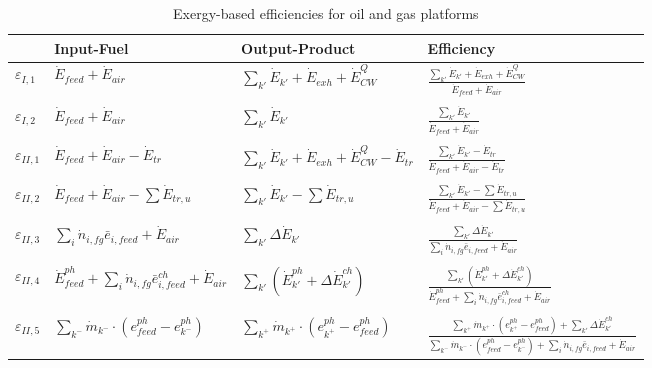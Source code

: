 \begin{table}[htbp]
\scriptsize
  \centering
  \caption{Exergy-based efficiencies for oil and gas platforms}
    \begin{tabular*}{\linewidth}{@{\extracolsep{\fill}}llll}
    \toprule
          & Input-Fuel  & Output-Product & Efficiency \\
	\toprule
	$\varepsilon_{I,1}$ & $\dot{E}_{feed}+\dot{E}_{air}$ & $\sum_{k'}\dot{E}_{k'}+\dot{E}_{exh}+\dot{E}^Q_{CW}$ & $\frac{\sum_{k'}\dot{E}_{k'}+\dot{E}_{exh}+\dot{E}^Q_{CW}}{\dot{E}_{feed}+\dot{E}_{air}}$ \\
    & & & \\	  
	$\varepsilon_{I,2}$ & $\dot{E}_{feed}+\dot{E}_{air}$ & $\sum_{k'}\dot{E}_{k'}$ & $\frac{\sum_{k'}\dot{E}_{k'}}{\dot{E}_{feed}+\dot{E}_{air}}$ \\
    & & & \\	  
	$\varepsilon_{II,1}$ & $\dot{E}_{feed}+\dot{E}_{air}-\dot{E}_{tr}$ & $\sum_{k'} \dot{E}_{k'}+\dot{E}_{exh}+\dot{E}^Q_{CW}-\dot{E}_{tr}$ & $\frac{\sum_{k'} \dot{E}_{k'}-\dot{E}_{tr}}{\dot{E}_{feed}+\dot{E}_{air}-\dot{E}_{tr}}$ \\
    & & & \\
	$\varepsilon_{II,2}$ & $\dot{E}_{feed}+\dot{E}_{air}-\sum \dot{E}_{tr,u}$& $\sum_{k'} \dot{E}_{k'}-\sum \dot{E}_{tr,u}$ & $\frac{\sum_{k'} \dot{E}_{k'}-\sum \dot{E}_{tr,u}}{\dot{E}_{feed}+\dot{E}_{air}-\sum \dot{E}_{tr,u}}$ \\
    & & & \\
    $\varepsilon_{II,3}$ & $\sum_i \dot{n}_{i,fg}\bar{e}_{i,feed}+\dot{E}_{air}$ & $\sum_{k'}\Delta\dot{E}_{k'}$ & $\frac{\sum_{k'}\Delta\dot{E}_{k'}}{\sum_i \dot{n}_{i,fg}\bar{e}_{i,feed}+\dot{E}_{air}}$ \\
	& & & \\
	$\varepsilon_{II,4}$ & $\dot{E}^{ph}_{feed}+\sum_i \dot{n}_{i,fg}\bar{e}^{ch}_{i,feed}+\dot{E}_{air}$   &  $\sum_{k'}\left(\dot{E}^{ph}_{k'}+\Delta{\dot{E}}^{ch}_{k'}\right)$ & $\frac{\sum_{k'}\left(\dot{E}^{ph}_{k'}+\Delta{\dot{E}}^{ch}_{k'}\right)}{\dot{E}^{ph}_{feed}+\sum_i \dot{n}_{i,fg}\bar{e}^{ch}_{i,feed}+\dot{E}_{air}}$ \\
	& & & \\
	$\varepsilon_{II,5}$ & $\sum_{k^{-}} \dot{m}_{k^{-}}\cdot(e_{feed}^{ph}-e_{k^{-}}^{ph})$ & $\sum_{k^{+}}\dot{m}_{k^{+}}\cdot(e_{k^{+}}^{ph}-e_{feed}^{ph})$ & $\frac{\sum_{k^{+}}\dot{m}_{k^{+}}\cdot(e_{k^{+}}^{ph}-e_{feed}^{ph})+\sum_{k'}\Delta{\dot{E}}^{ch}_{k'}}{\sum_{k^{-}} \dot{m}_{k^{-}}\cdot(e_{feed}^{ph}-e_{k^{-}}^{ph})+\sum_i \dot{n}_{i,fg}\bar{e}_{i,feed}+\dot{E}_{air}}$ \\

\end{tabular*}
\end{table}
